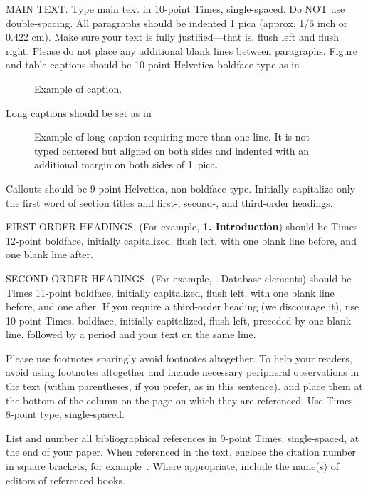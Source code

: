 \documentclass[times, 10pt,twocolumn]{article}
\begin{document}
MAIN TEXT. Type main text in 10-point Times, single-spaced.  Do NOT use
double-spacing. All paragraphs should be indented 1 pica (approx. 1/6 inch
or 0.422 cm). Make sure your text is fully justified---that is, flush left
and flush right.  Please do not place any additional blank lines between
paragraphs.  Figure and table captions should be 10-point Helvetica
boldface type as in \begin{figure}[h] \caption{Example of caption.}
\end{figure}

\noindent Long captions should be set as in \begin{figure}[h]
	\caption{Example of long caption requiring more than one line. It is not
	typed centered but aligned on both sides and indented with an additional
margin on both sides of 1~pica.} \end{figure}

\noindent Callouts should be 9-point Helvetica, non-boldface type.
Initially capitalize only the first word of section titles and first-,
second-, and third-order headings.

FIRST-ORDER HEADINGS. (For example, {\large \bf 1.  Introduction}) should
be Times 12-point boldface, initially capitalized, flush left, with one
blank line before, and one blank line after.

SECOND-ORDER HEADINGS. (For example, {. Database elements})
should be Times 11-point boldface, initially capitalized, flush left, with
one blank line before, and one after. If you require a third-order heading
(we discourage it), use 10-point Times, boldface, initially capitalized,
flush left, preceded by one blank line, followed by a period and your text
on the same line.


Please use footnotes sparingly%
	avoid footnotes altogether.  To help your readers, avoid using footnotes
	altogether and include necessary peripheral observations in the text
	(within parentheses, if you prefer, as in this sentence). and place them
	at the bottom of the column on the page on which they are referenced.
	Use Times 8-point type, single-spaced.



List and number all bibliographical references in 9-point Times,
single-spaced, at the end of your paper. When referenced in the text,
enclose the citation number in square brackets, for example~\cite{ex1}.
Where appropriate, include the name(s) of editors of referenced books.
\end{document}
